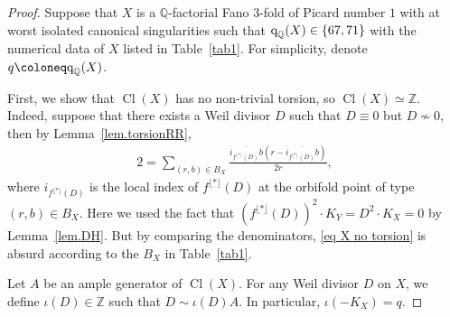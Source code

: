 \documentclass[12pt,twoside]{amsart}
\DeclareMathOperator{\Cl}{Cl}
\newcommand{\qQ}{\text{\rm q}_{\mathbb{Q}}}
\theoremstyle{definition}
\begin{document}
\begin{proof}
    Suppose that $X$ is a $\mathbb Q$-factorial Fano $3$-fold of Picard number $1$ with at worst isolated canonical singularities such that $\qQ(X)\in\{67, 71\}$ with the numerical data of $X$ listed in Table~\ref{tab1}. For simplicity, denote $q\coloneq \qQ(X)$. 

First, we show that $\Cl(X)$ has no non-trivial torsion, so $\Cl(X)\simeq \mathbb{Z}$.
Indeed, suppose that there exists a Weil divisor $D$ such that $D\equiv 0$ but $D\not\sim 0$, then by Lemma~\ref{lem.torsionRR},
\begin{align}
        2=\sum_{(r,b)\in B_X}\frac{\overline{ i_{f^{\lfloor *\rfloor}(D)} b}(r-\overline{i_{f^{\lfloor *\rfloor}(D)}b})}{2r},\label{eq X no torsion}
    \end{align}
    where $i_{f^{\lfloor *\rfloor}(D)} $ is the local index of ${f^{\lfloor *\rfloor}(D)}$ at the orbifold point of type $(r,b)\in B_X$. Here we used the fact that $(f^{\lfloor *\rfloor}(D))^2\cdot K_Y=D^2\cdot K_X=0$ by Lemma~\ref{lem.DH}.
    But by comparing the denominators, \eqref{eq X no torsion} is absurd according to the $B_X$ in Table~\ref{tab1}. 
    
    Let $A$ be an ample generator of $\Cl(X)$. For any Weil divisor $D$ on $X$, we define $\iota(D)\in \mathbb{Z}$ such that $D\sim \iota(D) A$. In particular, $\iota(-K_X)=q$. 


\end{proof}
\end{document}
